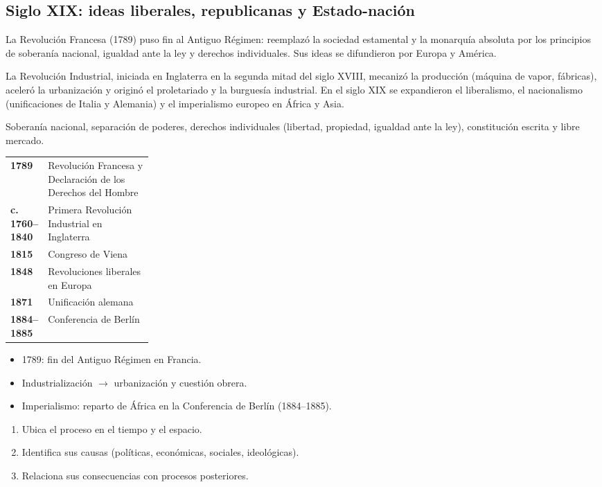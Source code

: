 \documentclass[10pt,a4paper,twocolumn]{article}
\makeatletter
\renewcommand{\arraystretch}{1.18}
\newenvironment{lineatiempo}[1][Línea de tiempo]
  {\begin{tcolorbox}[paes, acento=zinc700, title={#1}]\small\renewcommand{\arraystretch}{1.25}%
   \begin{tabular}{@{}>{\leavevmode\sffamily\bfseries\color{zinc700}}p{0.24\linewidth}p{\dimexpr0.76\linewidth-2\tabcolsep\relax}@{}}}
  {\end{tabular}\end{tcolorbox}}
\makeatother
\begin{document}
\subsection{Siglo XIX: ideas liberales, republicanas y Estado-nación}

La Revolución Francesa (1789) puso fin al Antiguo Régimen: reemplazó la sociedad estamental y la monarquía absoluta por los principios de soberanía nacional, igualdad ante la ley y derechos individuales. Sus ideas se difundieron por Europa y América.

La Revolución Industrial, iniciada en Inglaterra en la segunda mitad del siglo XVIII, mecanizó la producción (máquina de vapor, fábricas), aceleró la urbanización y originó el proletariado y la burguesía industrial. En el siglo XIX se expandieron el liberalismo, el nacionalismo (unificaciones de Italia y Alemania) y el imperialismo europeo en África y Asia.

\begin{definicion}
Soberanía nacional, separación de poderes, derechos individuales (libertad, propiedad, igualdad ante la ley), constitución escrita y libre mercado.
\end{definicion}

\begin{lineatiempo}
1789 & Revolución Francesa y Declaración de los Derechos del Hombre \\
c. 1760–1840 & Primera Revolución Industrial en Inglaterra \\
1815 & Congreso de Viena \\
1848 & Revoluciones liberales en Europa \\
1871 & Unificación alemana \\
1884–1885 & Conferencia de Berlín \\
\end{lineatiempo}

\begin{ideasclave}
\begin{itemize}
  \item 1789: fin del Antiguo Régimen en Francia.
  \item Industrialización $\rightarrow$ urbanización y cuestión obrera.
  \item Imperialismo: reparto de África en la Conferencia de Berlín (1884–1885).
\end{itemize}
\end{ideasclave}

\begin{metodo}
\begin{enumerate}
  \item Ubica el proceso en el tiempo y el espacio.
  \item Identifica sus causas (políticas, económicas, sociales, ideológicas).
  \item Relaciona sus consecuencias con procesos posteriores.
\end{enumerate}
\end{metodo}
\end{document}
